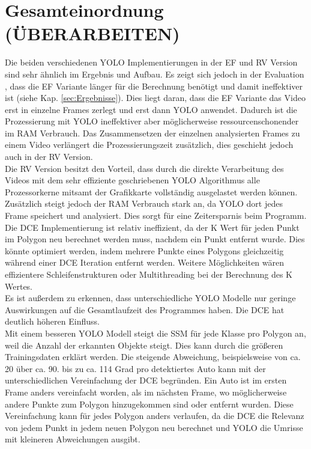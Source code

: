 {	\section{Gesamteinordnung (ÜBERARBEITEN)}
	{ 
	Die beiden verschiedenen YOLO Implementierungen in der EF und RV Version sind sehr ähnlich im Ergebnis und Aufbau. Es zeigt sich jedoch in der Evaluation , dass die EF Variante länger für die Berechnung benötigt und damit ineffektiver ist (siehe Kap. \ref{sec:Ergebnisse}). Dies liegt daran, dass die EF Variante das Video erst in einzelne Frames zerlegt und erst dann YOLO anwendet. Dadurch ist die Prozessierung mit YOLO ineffektiver aber möglicherweise ressourcenschonender im RAM Verbrauch.  Das Zusammensetzen der einzelnen analysierten Frames zu einem Video verlängert die Prozessierungszeit zusätzlich, dies geschieht jedoch auch in der RV Version. \\
	Die RV Version besitzt den Vorteil, dass durch die direkte Verarbeitung des Videos mit dem sehr effiziente geschriebenen YOLO Algorithmus alle Prozessorkerne mitsamt der Grafikkarte vollständig ausgelastet werden können. Zusätzlich steigt jedoch der RAM Verbrauch stark an, da YOLO dort jedes Frame speichert und analysiert. Dies sorgt für eine Zeitersparnis beim Programm. \\ 
	Die DCE Implementierung ist relativ ineffizient, da der K Wert für jeden Punkt im Polygon neu berechnet werden muss, nachdem ein Punkt entfernt wurde. Dies könnte optimiert werden, indem mehrere Punkte eines Polygons gleichzeitig während einer DCE Iteration entfernt werden. Weitere Möglichkeiten wären effizientere Schleifenstrukturen oder Multithreading bei der Berechnung des K Wertes. \\
	Es ist außerdem zu erkennen, dass unterschiedliche YOLO Modelle nur geringe Auswirkungen auf die Gesamtlaufzeit des Programmes haben. Die DCE hat deutlich höheren Einfluss. \\
	
	Mit einem besseren YOLO Modell steigt die SSM für jede Klasse pro Polygon an, weil die Anzahl der erkannten Objekte steigt. Dies kann durch die größeren Trainingsdaten erklärt werden. Die steigende Abweichung, beispielsweise von ca. 20 über ca. 90. bis zu ca. 114 Grad pro detektiertes Auto kann mit der unterschiedlichen Vereinfachung der DCE begründen. Ein Auto ist im ersten Frame anders vereinfacht worden, als im nächsten Frame, wo möglicherweise andere Punkte zum Polygon hinzugekommen sind oder entfernt wurden. Diese Vereinfachung kann für jedes Polygon anders verlaufen, da die DCE die Relevanz von jedem Punkt in jedem neuen Polygon neu berechnet und YOLO die Umrisse mit kleineren Abweichungen ausgibt.

}}
